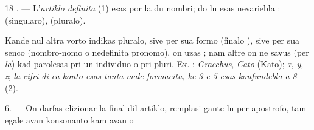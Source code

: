 \begin{VUpage}[22]{18}
. --- L'\textit{artiklo definita} (1) esas  por la du nombri; do\nl
lu esas nevariebla :  (singularo),  (pluralo).

Kande nul altra vorto indikas pluralo, sive per sua formo\nl
(finalo ), sive per sua senco (nombro-nomo o nedefinita\nl
pronomo), on uzas ; nam altre on ne savus (per \textit{la}) kad\nl
parolesas pri un individuo o pri pluri. Ex. :  \textit{Gracchus},\nl
{} \textit{Cato} (Kato);  \textit{x},  \textit{y},  \textit{z}; \textit{la cifri di ca konto esas tanta}\nl
\textit{male formacita, ke}  \textit{3 e}  \textit{5 esas konfundebla a}  \textit{8} (2).

6. --- On darfas elizionar la  final dil artiklo, remplasi\cc
gante lu per apostrofo, tam egale avan konsonanto kam avan\nl
\nl
{} o 
\end{VUpage}

